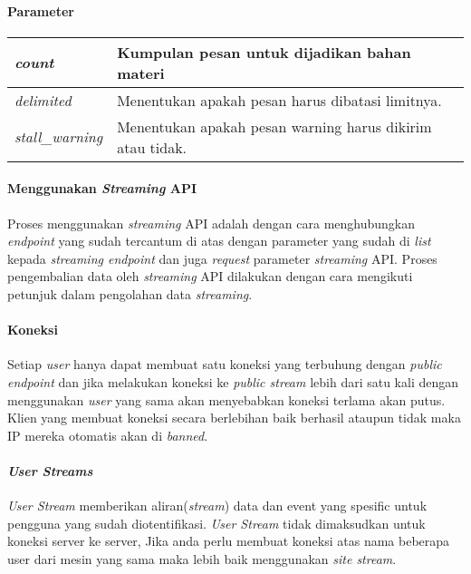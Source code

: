 \paragraph{Parameter}

\begin{table}[h]
\begin{tabular}{|l|l|}
\hline
\textit{count} & Kumpulan pesan untuk dijadikan bahan materi \\ \hline
\textit{delimited}          & Menentukan apakah pesan harus dibatasi limitnya. \\ \hline
\textit{stall\_warning}           & Menentukan apakah pesan warning harus dikirim atau tidak.                \\     \hline        
\end{tabular}
\end{table}


\paragraph{Menggunakan \textit{Streaming} API}
Proses menggunakan \textit{streaming} API adalah dengan cara menghubungkan \textit{endpoint} yang sudah tercantum di atas dengan parameter yang sudah di \textit{list} kepada \textit{streaming endpoint} dan juga \textit{request} parameter \textit{streaming} API. Proses pengembalian data oleh \textit{streaming} API dilakukan dengan cara mengikuti petunjuk dalam pengolahan data \textit{streaming}.

\paragraph{Koneksi}
Setiap \textit{user} hanya dapat membuat satu koneksi yang terbuhung dengan \textit{public endpoint} dan jika melakukan koneksi ke \textit{public stream} lebih dari satu kali dengan menggunakan \textit{user} yang sama akan menyebabkan koneksi terlama akan putus. Klien yang membuat koneksi secara berlebihan baik berhasil ataupun tidak maka IP mereka otomatis akan di \textit{banned}.

\paragraph{\textit{User Streams}}
\textit{User Stream} memberikan aliran(\textit{stream}) data dan event yang spesific untuk pengguna yang sudah diotentifikasi. \textit{User Stream} tidak dimaksudkan untuk koneksi server ke server, Jika anda perlu membuat koneksi atas nama beberapa user dari mesin yang sama maka lebih baik menggunakan \textit{site stream}.


